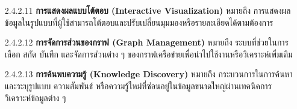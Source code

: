 \documentclass[12pt,a4paper]{article}
\begin{document}
\begin{enumerate}[leftmargin=2cm]
{\begin{enumerate}
\begin{enumerate}
                \item[2.4.2.11] \textbf{การแสดงผลแบบโต้ตอบ (Interactive Visualization)} หมายถึง การแสดงผลข้อมูลในรูปแบบที่ผู้ใช้สามารถโต้ตอบและปรับเปลี่ยนมุมมองหรือรายละเอียดได้ตามต้องการ
                \item[2.4.2.12] \textbf{การจัดการส่วนของกราฟ (Graph Management)} หมายถึง ระบบที่ช่วยในการเลือก สกัด บันทึก และจัดการส่วนต่าง ๆ ของกราฟเครือข่ายเพื่อนำไปใช้งานหรือวิเคราะห์เพิ่มเติม
                \item[2.4.2.13] \textbf{การค้นพบความรู้ (Knowledge Discovery)} หมายถึง กระบวนการในการค้นหาและระบุรูปแบบ ความสัมพันธ์ หรือความรู้ใหม่ที่ซ่อนอยู่ในข้อมูลขนาดใหญ่ผ่านเทคนิคการวิเคราะห์ข้อมูลต่าง ๆ
            \end{enumerate}

            \vspace{3.7cm}


\end{enumerate}}
\end{enumerate}
\end{document}

